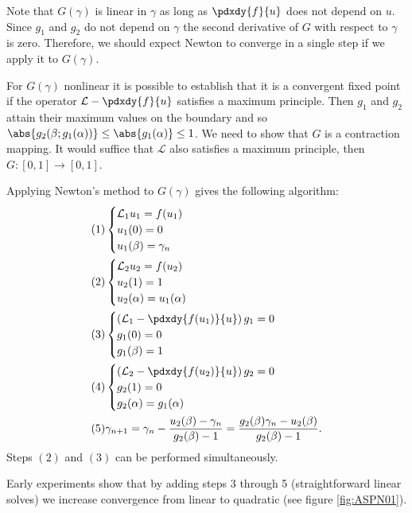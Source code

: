 \documentclass{book}
\begin{document}
Note that $G(\gamma)$ is linear in $\gamma$ as long as $\pdxdy{f}{u}$ does not depend on $u$.
Since $g_1$ and $g_2$ do not depend on $\gamma$ the second derivative of $G$ with respect to $\gamma$ is zero.
Therefore, we should expect Newton to converge in a single step if we apply it to $G(\gamma)$.

For $G(\gamma)$ nonlinear it is possible to establish that it is a convergent fixed point if the operator $\mathcal{L} - \pdxdy{f}{u}$ satisfies a maximum principle.
Then $g_1$ and $g_2$ attain their maximum values on the boundary and so $\abs{g_2(\beta;g_1(\alpha))} \leq \abs{g_1(\alpha)} \leq 1$.
We need to show that $G$ is a contraction mapping.
It would suffice that $\mathcal{L}$ also satisfies a maximum principle, then $G:[0,1] \rightarrow [0,1]$.

Applying Newton's method to $G(\gamma)$ gives the following algorithm:
\begin{align*}
(1) & \begin{cases} \mathcal{L}_1 u_1 = f(u_1) \\ u_1(0) = 0 \\ u_1(\beta) = \gamma_n \end{cases} \\
(2) & \begin{cases} \mathcal{L}_2 u_2 = f(u_2) \\ u_2(1) = 1 \\ u_2(\alpha) = u_1(\alpha) \end{cases} \\
(3) & \begin{cases} \left ( \mathcal{L}_1 - \pdxdy{f(u_1)}{u} \right ) g_1 = 0 \\
g_1(0) = 0 \\ g_1(\beta) = 1 \end{cases} \\
(4) & \begin{cases} \left ( \mathcal{L}_2 - \pdxdy{f(u_2)}{u} \right ) g_2 = 0 \\
g_2(1) = 0 \\ g_2(\alpha) = g_1(\alpha) \end{cases} \\
(5) & \gamma_{n+1} = \gamma_n - \frac{ u_2(\beta) - \gamma_n }{g_2(\beta) - 1} = \frac{ g_2(\beta) \gamma_n - u_2(\beta)}{g_2(\beta) - 1} .
\end{align*}
Steps $(2)$ and $(3)$ can be performed simultaneously.

Early experiments show that by adding steps 3 through 5 (straightforward linear solves) we increase convergence from linear to quadratic (see figure \ref{fig:ASPN01}).
\end{document}

